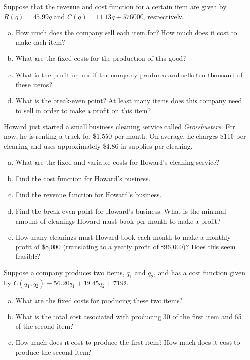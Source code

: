 \documentclass[11pt,letterpaper]{article}
\begin{document}

 Suppose that the revenue and cost function for a certain item are given by $R(q)= 45.99q$ and $C(q)= 11.13q + 576000$, respectively. 
	\begin{enumerate}[(a)]
	\item How much does the company sell each item for? How much does it cost to make each item?
	\item What are the fixed costs for the production of this good?
	\item What is the profit or loss if the company produces and sells ten-thousand of these items?
	\item What is the break-even point? At least many items does this company need to sell in order to make a profit on this item?
	\end{enumerate}



\newpage



 Howard just started a small business cleaning service called \textit{Grossbusters}. For now, he is renting a truck for \$1,550 per month. On average, he charges \$110 per cleaning and uses approximately \$4.86 in supplies per cleaning. 
	\begin{enumerate}[(a)]
	\item What are the fixed and variable costs for Howard's cleaning service?
	\item Find the cost function for Howard's business.
	\item Find the revenue function for Howard's business.
	\item Find the break-even point for Howard's business. What is the minimal amount of cleanings Howard must book per month to make a profit?
	\item How many cleanings must Howard book each month to make a monthly profit of \$8,000 (translating to a yearly profit of \$96,000)? Does this seem feasible? 
	\end{enumerate}



\newpage



 Suppose a company produces two items, $q_1$ and $q_2$, and has a cost function given by $C(q_1, q_2)= 56.20q_1 + 19.45q_2 + 7192$. 
	\begin{enumerate}[(a)]
	\item What are the fixed costs for producing these two items?
	\item What is the total cost associated with producing 30 of the first item and 65 of the second item?
	\item How much does it cost to produce the first item? How much does it cost to produce the second item?
	\end{enumerate}
\end{document}
